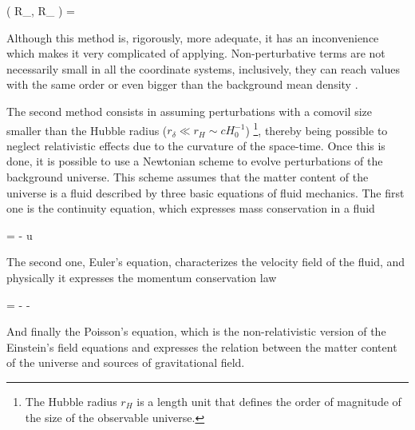 { ( R_{\mu \nu}, \delta R_{\mu \nu} ) = 
 }


Although this method is, rigorously, more adequate, it has an inconvenience
which makes it very complicated of applying. Non-perturbative terms are 
not necessarily small in all the coordinate systems, inclusively, they can 
reach values with the same order or even bigger than the background mean 
density \cite{padmanabhan1995}.


The second method consists in assuming perturbations with a comovil size
smaller than the Hubble radius ($r_\delta \ll r_H \sim cH_0^{-1}$)
\footnote{The Hubble radius $r_H$ is a length unit that defines the 
order of magnitude of the size of the observable universe.}, thereby
being possible to neglect relativistic effects due to the curvature
of the space-time. Once this is done, it is possible to use a Newtonian
scheme to evolve perturbations of the background universe. This scheme
assumes that the matter content of the universe is a fluid described by
three basic equations of fluid mechanics. The first one is the continuity
equation, which expresses mass conservation in a fluid



{  = - \rho \nabla \cdot \bds u }


The second one, Euler's equation, characterizes the velocity field of the 
fluid, and physically it expresses the momentum conservation law


{  = - - \nabla \varphi }


And finally the Poisson's equation, which is the non-relativistic version
of the Einstein's field equations and expresses the relation between the
matter content of the universe and sources of gravitational field.

	
	
